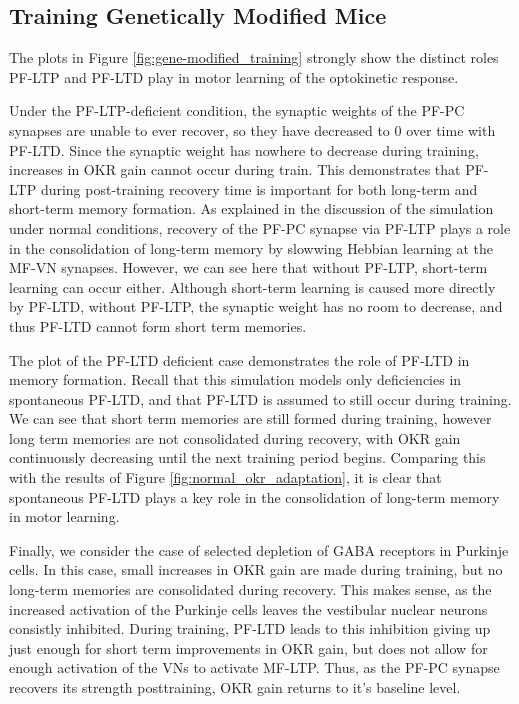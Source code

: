 \documentclass[10pt]{article}
\begin{document}
\subsection{Training Genetically Modified Mice}

The plots in Figure \ref{fig:gene-modified_training} strongly show the distinct roles PF-LTP and PF-LTD play in motor learning of the optokinetic response.

Under the PF-LTP-deficient condition, the synaptic weights of the PF-PC synapses are unable to ever recover, so they have decreased to 0 over time with PF-LTD. Since the synaptic weight has nowhere to decrease during training, increases in OKR gain cannot occur during train. This demonstrates that PF-LTP during post-training recovery time is important for both long-term and short-term memory formation. As explained in the discussion of the simulation under normal conditions, recovery of the PF-PC synapse via PF-LTP plays a role in the consolidation of long-term memory by slowwing Hebbian learning at the MF-VN synapses. However, we can see here that without PF-LTP, short-term learning can occur either. Although short-term learning is caused more directly by PF-LTD, without PF-LTP, the synaptic weight has no room to decrease, and thus PF-LTD cannot form short term memories.

The plot of the PF-LTD deficient case demonstrates the role of PF-LTD in memory formation. Recall that this simulation models only deficiencies in spontaneous PF-LTD, and that PF-LTD is assumed to still occur during training. We can see that short term memories are still formed during training, however long term memories are not consolidated during recovery, with OKR gain continuously decreasing until the next training period begins. Comparing this with the results of Figure \ref{fig:normal_okr_adaptation}, it is clear that spontaneous PF-LTD plays a key role in the consolidation of long-term memory in motor learning.

Finally, we consider the case of selected depletion of GABA receptors in Purkinje cells. In this case, small increases in OKR gain are made during training, but no long-term memories are consolidated during recovery. This makes sense, as the increased activation of the Purkinje cells leaves the vestibular nuclear neurons consistly inhibited. During training, PF-LTD leads to this inhibition giving up just enough for short term improvements in OKR gain, but does not allow for enough activation of the VNs to activate MF-LTP. Thus, as the PF-PC synapse recovers its strength posttraining, OKR gain returns to it's baseline level.
\end{document}
